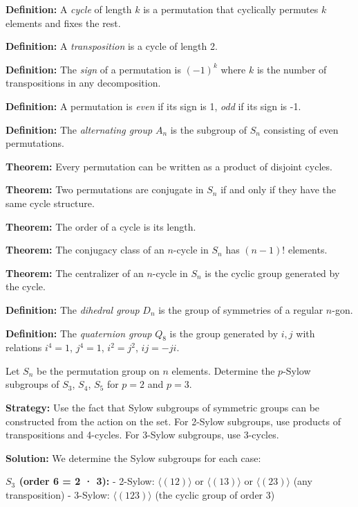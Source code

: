 \textbf{Definition:} A \textit{cycle} of length $k$ is a permutation that cyclically permutes $k$ elements and fixes the rest.

\textbf{Definition:} A \textit{transposition} is a cycle of length 2.

\textbf{Definition:} The \textit{sign} of a permutation is $(-1)^k$ where $k$ is the number of transpositions in any decomposition.

\textbf{Definition:} A permutation is \textit{even} if its sign is 1, \textit{odd} if its sign is -1.

\textbf{Definition:} The \textit{alternating group} $A_n$ is the subgroup of $S_n$ consisting of even permutations.

\textbf{Theorem:} Every permutation can be written as a product of disjoint cycles.

\textbf{Theorem:} Two permutations are conjugate in $S_n$ if and only if they have the same cycle structure.

\textbf{Theorem:} The order of a cycle is its length.

\textbf{Theorem:} The conjugacy class of an $n$-cycle in $S_n$ has $(n-1)!$ elements.

\textbf{Theorem:} The centralizer of an $n$-cycle in $S_n$ is the cyclic group generated by the cycle.

\textbf{Definition:} The \textit{dihedral group} $D_n$ is the group of symmetries of a regular $n$-gon.

\textbf{Definition:} The \textit{quaternion group} $Q_8$ is the group generated by $i, j$ with relations $i^4 = 1$, $j^4 = 1$, $i^2 = j^2$, $ij = -ji$.

\begin{problembox}
Let $S_n$ be the permutation group on $n$ elements. Determine the $p$-Sylow subgroups of $S_3$, $S_4$, $S_5$ for $p = 2$ and $p = 3$.
\end{problembox}

\noindent\textbf{Strategy:} Use the fact that Sylow subgroups of symmetric groups can be constructed from the action on the set. For 2-Sylow subgroups, use products of transpositions and 4-cycles. For 3-Sylow subgroups, use 3-cycles.

\noindent\textbf{Solution:} We determine the Sylow subgroups for each case:

\textbf{$S_3$ (order 6 = 2 · 3):}
- 2-Sylow: $\langle (12) \rangle$ or $\langle (13) \rangle$ or $\langle (23) \rangle$ (any transposition)
- 3-Sylow: $\langle (123) \rangle$ (the cyclic group of order 3)

